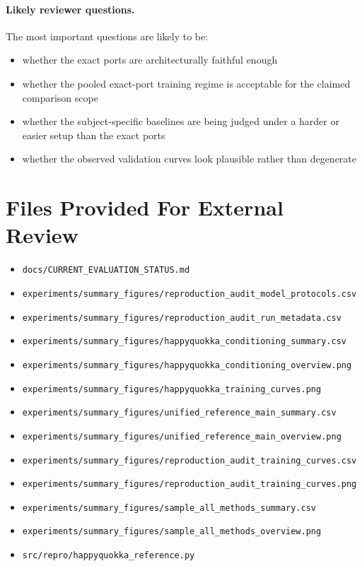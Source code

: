 \documentclass[11pt]{article}
\begin{document}
\paragraph{Likely reviewer questions.}
The most important questions are likely to be:
\begin{itemize}
\item whether the exact ports are architecturally faithful enough
\item whether the pooled exact-port training regime is acceptable for the claimed comparison scope
\item whether the subject-specific baselines are being judged under a harder or easier setup than the exact ports
\item whether the observed validation curves look plausible rather than degenerate
\end{itemize}

\section*{Files Provided For External Review}
\begin{itemize}
\item \texttt{docs/CURRENT\_EVALUATION\_STATUS.md}
\item \texttt{experiments/summary\_figures/reproduction\_audit\_model\_protocols.csv}
\item \texttt{experiments/summary\_figures/reproduction\_audit\_run\_metadata.csv}
\item \texttt{experiments/summary\_figures/happyquokka\_conditioning\_summary.csv}
\item \texttt{experiments/summary\_figures/happyquokka\_conditioning\_overview.png}
\item \texttt{experiments/summary\_figures/happyquokka\_training\_curves.png}
\item \texttt{experiments/summary\_figures/unified\_reference\_main\_summary.csv}
\item \texttt{experiments/summary\_figures/unified\_reference\_main\_overview.png}
\item \texttt{experiments/summary\_figures/reproduction\_audit\_training\_curves.csv}
\item \texttt{experiments/summary\_figures/reproduction\_audit\_training\_curves.png}
\item \texttt{experiments/summary\_figures/sample\_all\_methods\_summary.csv}
\item \texttt{experiments/summary\_figures/sample\_all\_methods\_overview.png}
\item \texttt{src/repro/happyquokka\_reference.py}
\end{itemize}
\end{document}
